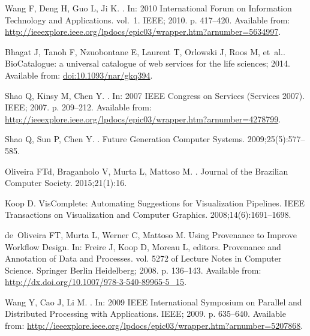 \documentclass[10pt,letterpaper]{article}
\begin{document}
\begin{thebibliography}{10}
	
	Wang F, Deng H, Guo L, Ji K.
	.
	\newblock In: 2010 International Forum on Information Technology and
	Applications. vol.~1. IEEE; 2010. p. 417--420.
	\newblock Available from:
	\url{http://ieeexplore.ieee.org/lpdocs/epic03/wrapper.htm?arnumber=5634997}.
	
	Bhagat J, Tanoh F, Nzuobontane E, Laurent T, Orlowski J, Roos M, et~al..
	BioCatalogue: a universal catalogue of web services for the life sciences;
	2014.
	\newblock Available from: \url{doi:10.1093/nar/gkq394}.
	
	Shao Q, Kinsy M, Chen Y.
	.
	\newblock In: 2007 IEEE Congress on Services (Services 2007). IEEE; 2007. p.
	209--212.
	\newblock Available from:
	\url{http://ieeexplore.ieee.org/lpdocs/epic03/wrapper.htm?arnumber=4278799}.
	
	Shao Q, Sun P, Chen Y.
	.
	\newblock Future Generation Computer Systems. 2009;25(5):577--585.
	
	Oliveira FTd, Braganholo V, Murta L, Mattoso M.
	.
	\newblock Journal of the Brazilian Computer Society. 2015;21(1):16.
	
	Koop D.
	\newblock VisComplete: Automating Suggestions for Visualization Pipelines.
	\newblock IEEE Transactions on Visualization and Computer Graphics.
	2008;14(6):1691--1698.
	
	de~Oliveira FT, Murta L, Werner C, Mattoso M.
	\newblock Using Provenance to Improve Workflow Design.
	\newblock In: Freire J, Koop D, Moreau L, editors. Provenance and Annotation of
	Data and Processes. vol. 5272 of Lecture Notes in Computer Science. Springer
	Berlin Heidelberg; 2008. p. 136--143.
	\newblock Available from:
	\url{http://dx.doi.org/10.1007/978-3-540-89965-5\_15}.
	
	Wang Y, Cao J, Li M.
	.
	\newblock In: 2009 IEEE International Symposium on Parallel and Distributed
	Processing with Applications. IEEE; 2009. p. 635--640.
	\newblock Available from:
	\url{http://ieeexplore.ieee.org/lpdocs/epic03/wrapper.htm?arnumber=5207868}.
	

\end{thebibliography}
\end{document}
